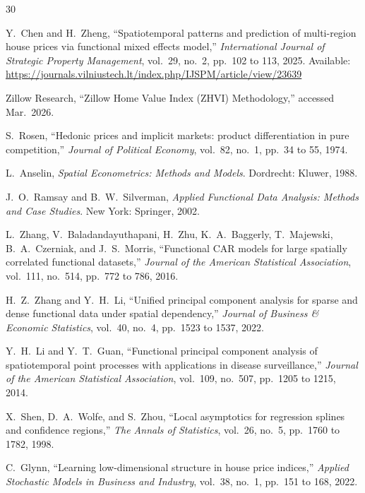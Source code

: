 \documentclass[runningheads]{llncs}
\begin{document}
\clearpage
\begin{thebibliography}{30}

Y.~Chen and H.~Zheng,
``Spatiotemporal patterns and prediction of multi-region house prices via
functional mixed effects model,''
\emph{International Journal of Strategic Property Management},
vol.~29, no.~2, pp.~102 to 113, 2025.
Available: \url{https://journals.vilniustech.lt/index.php/IJSPM/article/view/23639}

Zillow Research,
``Zillow Home Value Index (ZHVI) Methodology,''
accessed Mar.\ 2026.

S.~Rosen,
``Hedonic prices and implicit markets: product differentiation in pure
competition,''
\emph{Journal of Political Economy}, vol.~82, no.~1, pp.~34 to 55, 1974.

L.~Anselin,
\emph{Spatial Econometrics: Methods and Models}.
Dordrecht: Kluwer, 1988.

J.~O.~Ramsay and B.~W.~Silverman,
\emph{Applied Functional Data Analysis: Methods and Case Studies}.
New York: Springer, 2002.

L.~Zhang, V.~Baladandayuthapani, H.~Zhu, K.~A.~Baggerly, T.~Majewski,
B.~A.~Czerniak, and J.~S.~Morris,
``Functional CAR models for large spatially correlated functional datasets,''
\emph{Journal of the American Statistical Association},
vol.~111, no.~514, pp.~772 to 786, 2016.

H.~Z.~Zhang and Y.~H.~Li,
``Unified principal component analysis for sparse and dense functional data
under spatial dependency,''
\emph{Journal of Business \& Economic Statistics},
vol.~40, no.~4, pp.~1523 to 1537, 2022.

Y.~H.~Li and Y.~T.~Guan,
``Functional principal component analysis of spatiotemporal point processes
with applications in disease surveillance,''
\emph{Journal of the American Statistical Association},
vol.~109, no.~507, pp.~1205 to 1215, 2014.

X.~Shen, D.~A.~Wolfe, and S.~Zhou,
``Local asymptotics for regression splines and confidence regions,''
\emph{The Annals of Statistics}, vol.~26, no.~5, pp.~1760 to 1782, 1998.

C.~Glynn,
``Learning low-dimensional structure in house price indices,''
\emph{Applied Stochastic Models in Business and Industry},
vol.~38, no.~1, pp.~151 to 168, 2022.


\end{thebibliography}
\end{document}
